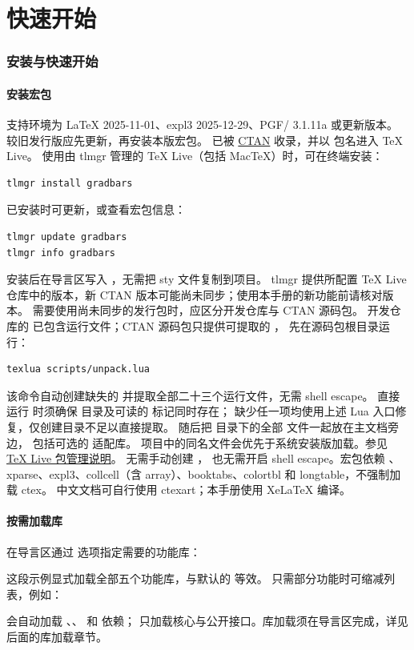 \part{快速开始}

\section{安装与快速开始}
\subsection{安装宏包}
支持环境为 LaTeX 2025-11-01、expl3 2025-12-29、PGF/\manualTikZ{} 3.1.11a 或更新版本。
较旧发行版应先更新，再安装本版宏包。
 已被 \href{https://ctan.org/pkg/gradbars}{CTAN} 收录，并以  包名进入 TeX Live。
使用由 tlmgr 管理的 TeX Live（包括 MacTeX）时，可在终端安装：
\begin{lstlisting}[style=manual,language={}]
tlmgr install gradbars
\end{lstlisting}
已安装时可更新，或查看宏包信息：
\begin{lstlisting}[style=manual,language={}]
tlmgr update gradbars
tlmgr info gradbars
\end{lstlisting}
安装后在导言区写入 \key{\usepackage{gradbars}}，无需把 sty 文件复制到项目。
tlmgr 提供所配置 TeX Live 仓库中的版本，新 CTAN 版本可能尚未同步；使用本手册的新功能前请核对版本。
需要使用尚未同步的发行包时，应区分开发仓库与 CTAN 源码包。
开发仓库的  已包含运行文件；CTAN 源码包只提供可提取的 ，
先在源码包根目录运行：
\begin{lstlisting}[style=manual,language={}]
texlua scripts/unpack.lua
\end{lstlisting}
该命令自动创建缺失的  并提取全部二十三个运行文件，无需 shell escape。
直接运行  时须确保  目录及可读的  标记同时存在；
缺少任一项均使用上述 Lua 入口修复，仅创建目录不足以直接提取。
随后把  目录下的全部  文件一起放在主文档旁边，
包括可选的  适配库。
项目中的同名文件会优先于系统安装版加载。参见 \href{https://tug.org/texlive/doc/tlmgr.html}{TeX Live 包管理说明}。
无需手动创建 ，
也无需开启 shell escape。宏包依赖 \manualTikZ{}、xparse、expl3、collcell（含 array）、booktabs、colortbl 和 longtable，不强制加载 ctex。
中文文档可自行使用 ctexart；本手册使用 XeLaTeX 编译。

\subsection{按需加载库}
在导言区通过  选项指定需要的功能库：
\begin{codeonly}
\usepackage[libraries={stack,spark,heat,csv,table}]{gradbars}
\end{codeonly}
这段示例显式加载全部五个功能库，与默认的 \key{\usepackage{gradbars}} 等效。
只需部分功能时可缩减列表，例如：
\begin{codeonly}
\usepackage[libraries={stack,spark,heat}]{gradbars}
\end{codeonly}
 会自动加载 、、 和  依赖；
 只加载核心与公开接口。库加载须在导言区完成，详见后面的库加载章节。

